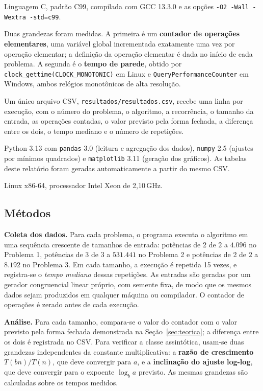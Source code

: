 \documentclass[11pt,a4paper]{article}
\begin{document}
\begin{description}[leftmargin=1.2cm,style=nextline,itemsep=2pt]
  \item[Implementação] Linguagem C, padrão C99, compilada com GCC 13.3.0 e as opções \texttt{-O2 -Wall -Wextra -std=c99}.
  \item[Medição de desempenho] Duas grandezas foram medidas. A primeira é um \textbf{contador de operações elementares}, uma variável global incrementada exatamente uma vez por operação elementar; a definição da operação elementar é dada no início de cada problema. A segunda é o \textbf{tempo de parede}, obtido por \texttt{clock\_gettime(CLOCK\_MONOTONIC)} em Linux e \texttt{QueryPerformanceCounter} em Windows, ambos relógios monotônicos de alta resolução.
  \item[Registro dos dados] Um único arquivo CSV, \texttt{resultados/resultados.csv}, recebe uma linha por execução, com o número do problema, o algoritmo, a recorrência, o tamanho da entrada, as operações contadas, o valor previsto pela forma fechada, a diferença entre os dois, o tempo mediano e o número de repetições.
  \item[Análise, tabelas e gráficos] Python 3.13 com \texttt{pandas} 3.0 (leitura e agregação dos dados), \texttt{numpy} 2.5 (ajustes por mínimos quadrados) e \texttt{matplotlib} 3.11 (geração dos gráficos). As tabelas deste relatório foram geradas automaticamente a partir do mesmo CSV.
  \item[Ambiente] Linux x86-64, processador Intel Xeon de 2,10\,GHz.
\end{description}

\subsection{Métodos}

\textbf{Coleta dos dados.} Para cada problema, o programa executa o algoritmo em uma sequência crescente de tamanhos de entrada: potências de 2 de $2$ a $4.096$ no Problema 1, potências de 3 de $3$ a $531.441$ no Problema 2 e potências de 2 de $2$ a $8.192$ no Problema 3. Em cada tamanho, a execução é repetida 15 vezes, e registra-se o \emph{tempo mediano} dessas repetições. As entradas são geradas por um gerador congruencial linear próprio, com semente fixa, de modo que os mesmos dados sejam produzidos em qualquer máquina ou compilador. O contador de operações é zerado antes de cada execução.

\textbf{Análise.} Para cada tamanho, compara-se o valor do contador com o valor previsto pela forma fechada demonstrada na Seção~\ref{sec:teorica}; a diferença entre os dois é registrada no CSV. Para verificar a classe assintótica, usam-se duas grandezas independentes da constante multiplicativa: a \textbf{razão de crescimento} $T(bn)/T(n)$, que deve convergir para $a$, e a \textbf{inclinação do ajuste log-log}, que deve convergir para o expoente $\log_b a$ previsto. As mesmas grandezas são calculadas sobre os tempos medidos.
\end{document}

